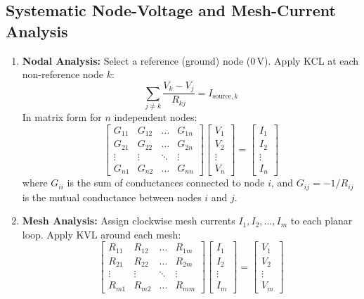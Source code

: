\subsection{Systematic Node-Voltage and Mesh-Current Analysis}
\begin{enumerate}
    \item \textbf{Nodal Analysis:} Select a reference (ground) node ($0\,\text{V}$). Apply KCL at each non-reference node $k$:
    \begin{equation}
        \sum_{j \neq k} \frac{V_k - V_j}{R_{kj}} = I_{\text{source}, k}
    \end{equation}
    In matrix form for $n$ independent nodes:
    \begin{equation}
        \begin{bmatrix} G_{11} & G_{12} & \dots & G_{1n} \\ G_{21} & G_{22} & \dots & G_{2n} \\ \vdots & \vdots & \ddots & \vdots \\ G_{n1} & G_{n2} & \dots & G_{nn} \end{bmatrix} \begin{bmatrix} V_1 \\ V_2 \\ \vdots \\ V_n \end{bmatrix} = \begin{bmatrix} I_1 \\ I_2 \\ \vdots \\ I_n \end{bmatrix}
    \end{equation}
    where $G_{ii}$ is the sum of conductances connected to node $i$, and $G_{ij} = -1/R_{ij}$ is the mutual conductance between nodes $i$ and $j$.
    \item \textbf{Mesh Analysis:} Assign clockwise mesh currents $I_1, I_2, \dots, I_m$ to each planar loop. Apply KVL around each mesh:
    \begin{equation}
        \begin{bmatrix} R_{11} & R_{12} & \dots & R_{1m} \\ R_{21} & R_{22} & \dots & R_{2m} \\ \vdots & \vdots & \ddots & \vdots \\ R_{m1} & R_{m2} & \dots & R_{mm} \end{bmatrix} \begin{bmatrix} I_1 \\ I_2 \\ \vdots \\ I_m \end{bmatrix} = \begin{bmatrix} V_1 \\ V_2 \\ \vdots \\ V_m \end{bmatrix}
    \end{equation}
\end{enumerate}

